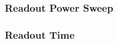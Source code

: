 \FloatBarrier
\subsubsection{Readout Power Sweep}

%
%
%

\FloatBarrier
\subsubsection{Readout Time}

%
